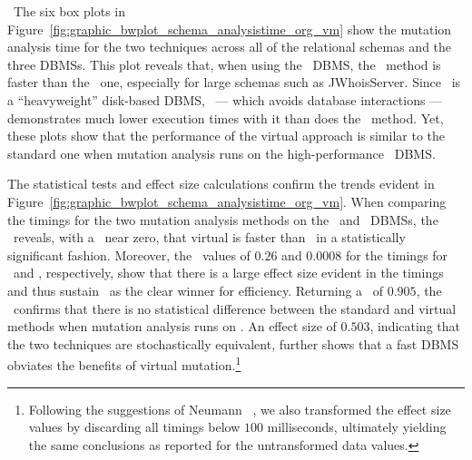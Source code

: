 

~The six box plots in Figure~\ref{fig:graphic_bwplot_schema_analysistime_org_vm} show the mutation analysis time for the two techniques across all of the relational schemas and the three DBMSs. This plot reveals that, when using the \HyperSQL~DBMS, the \virtual~method is faster than the \Original~one, especially for large schemas such as JWhoisServer. Since \Postgres~is a ``heavyweight'' disk-based DBMS, \vma~--- which avoids database interactions --- demonstrates much lower execution times with it than does the \Original~method. Yet, these plots show that the performance of the virtual approach is similar to the standard one when mutation analysis runs on the high-performance \sqlite~DBMS.


The statistical tests and effect size calculations confirm the trends evident in Figure~\ref{fig:graphic_bwplot_schema_analysistime_org_vm}. When comparing the timings for the two mutation analysis methods on the \HyperSQL~and \Postgres~DBMSs, the \wilcoxon~reveals, with a \pvalue~near zero, that virtual is faster than \Original~in a statistically significant fashion. Moreover, the \atwelve~values of $0.26$ and $0.0008$ for the timings for \HyperSQL~and \Postgres, respectively, show that there is a large effect size evident in the timings and thus sustain \vma~as the clear winner for efficiency. Returning a \pvalue~of $0.905$, the \wilcoxon~confirms that there is no statistical difference between the standard and virtual methods when mutation analysis runs on \sqlite. An effect size of $0.503$, indicating that the two techniques are stochastically equivalent, further shows that a fast DBMS obviates the benefits of virtual mutation.\footnote{{\scriptsize Following the suggestions of Neumann \etal~\cite{Neumann2015}, we also transformed the effect size values by discarding all timings below $100$ milliseconds, ultimately yielding the same conclusions as reported for the untransformed data values.}}

